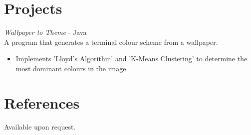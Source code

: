 \documentclass[a4paper,10pt]{article}
\begin{document}
\section{\textbf{Projects}}
\emph{Wallpaper to Theme} - Java\\
A program that generates a terminal colour scheme from a wallpaper.
\begin{itemize}
  \item Implements 'Lloyd's Algorithm' and 'K-Means Clustering' to determine the most dominant colours in the image.\end{itemize}

\section{\textbf{References}}
Available upon request.
\end{document}
